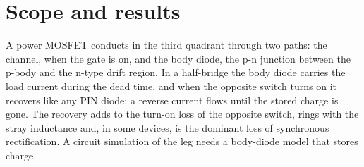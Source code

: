 \documentclass[10pt,a4paper]{scrartcl}
\begin{document}

\tableofcontents
\newpage

\section{Scope and results}
\label{sec:scope}
A power MOSFET conducts in the third quadrant through two paths: the channel, when the gate is on, and the body diode, the p-n junction between the p-body and the n-type drift region. In a half-bridge the body diode carries the load current during the dead time, and when the opposite switch turns on it recovers like any PIN diode: a reverse current flows until the stored charge is gone. The recovery adds to the turn-on loss of the opposite switch, rings with the stray inductance and, in some devices, is the dominant loss of synchronous rectification. A circuit simulation of the leg needs a body-diode model that stores charge.
\end{document}
